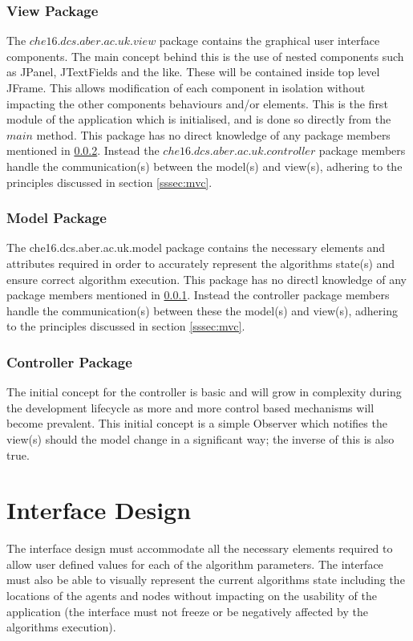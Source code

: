 \documentclass[10pt,a4paper]{article}
\begin{document}
\subsubsection{View Package}

\label{sssec:view}
The $che16.dcs.aber.ac.uk.view$ package contains the graphical user interface components. The main concept behind this is the use of nested components such as JPanel, JTextFields and the like. These will be contained inside top level JFrame. This allows modification of each component in isolation without impacting the other components behaviours and/or elements. This is the first module of the application which is initialised, and is done so directly from the $main$ method. This package has no direct knowledge of any package members mentioned in \ref{sssec:model}. Instead the $che16.dcs.aber.ac.uk.controller$ package members handle the communication(s) between the model(s) and view(s), adhering to the principles discussed in section \ref{sssec:mvc}.

\subsubsection{Model Package}
\label{sssec:model}
The che16.dcs.aber.ac.uk.model package contains the necessary elements and attributes required in order to accurately represent the algorithms state(s) and ensure correct algorithm execution. This package has no directl knowledge of any package members mentioned in \ref{sssec:view}. Instead the controller package members handle the communication(s) between these the model(s) and view(s), adhering to the principles discussed in section \ref{sssec:mvc}.

\subsubsection{Controller Package}
The initial concept for the controller is basic and will grow in complexity during the development lifecycle as more and more control based mechanisms will become prevalent. This initial concept is a simple Observer which notifies the view(s) should the model change in a significant way; the inverse of this is also true.

\section{Interface Design}

The interface design must accommodate all the necessary elements required to allow user defined values for each of the algorithm parameters. The interface must also be able to visually represent the current algorithms state including the locations of the agents and nodes without impacting on the usability of the application (the interface must not freeze or be negatively affected by the algorithms execution).
\end{document}
